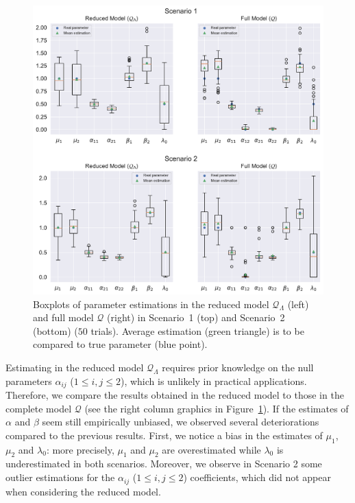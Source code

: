       \begin{figure}[!ht]
        \centering
        \includegraphics[width=\linewidth]{images/chapter4//column_triangle_model_estimation.pdf}
        \caption{Boxplots of parameter estimations in the reduced model $\mathcal{Q}_{\Lambda}$ (left) and full model $\mathcal{Q}$ (right)
        in Scenario~1 (top) and Scenario~2 (bottom) ($50$ trials).
        Average estimation (green triangle) is to be compared to true parameter (blue point).}
        \label{fig:chap4_column_triangle_model_estimation}
      \end{figure}
            
            Estimating in the reduced model $\mathcal Q_\Lambda$ requires prior knowledge on the null parameters $\alpha_{ij}$ ($1 \le i, j \le 2$), which is unlikely in practical applications. Therefore, we compare the results obtained in the reduced model to those in the complete model $\mathcal Q$ (see the right column graphics in Figure~\ref{fig:chap4_column_triangle_model_estimation}). If the estimates of $\alpha$ and $\beta$ seem still empirically unbiased, we observed several deteriorations compared to the previous results. First, we notice a bias in the estimates of $\mu_1$, $\mu_2$ and $\lambda_0$: more precisely, $\mu_1$ and $\mu_2$ are overestimated while $\lambda_0$ is underestimated in both scenarios. Moreover, we observe in Scenario 2 some outlier estimations for the $\alpha_{ij}$ ($1 \le i, j \le 2$) coefficients, which did not appear when considering the reduced model. 
		
